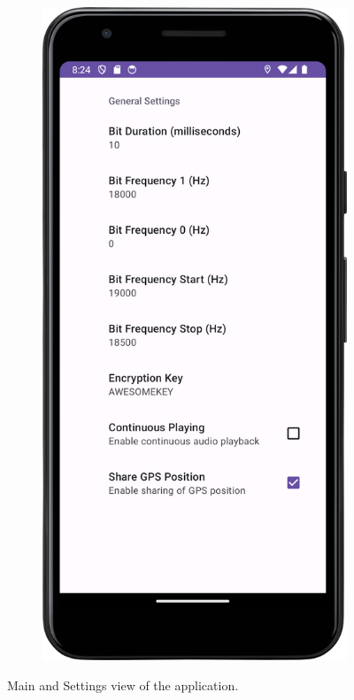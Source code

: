 \begin{figure}
\begin{subfigure}{0.30\textwidth}
    \end{subfigure}
    \begin{subfigure}{0.30\textwidth}
        \includegraphics[width=\linewidth]{LiveAudioWatermarking/images/setting_frame.png}
    \end{subfigure}
    \caption{Main and Settings view of the application.}
    \label{fig:APP}
\end{figure}

